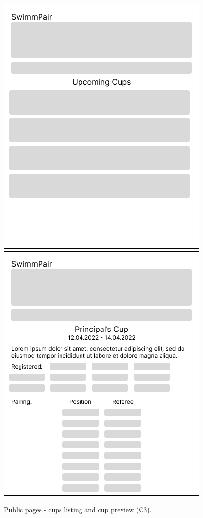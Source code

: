 \begin{figure}[h]	
	\centering	
    \includegraphics[scale=0.457]{img/def-U-ListingCups.png}
    \includegraphics[scale=0.457]{img/def-U-Cup.png}
	\caption{Public pages - \underline{cups listing and cup preview (C3)}.}
	\label{fig2.3:fepublicpages2}
\end{figure}
\newpage

